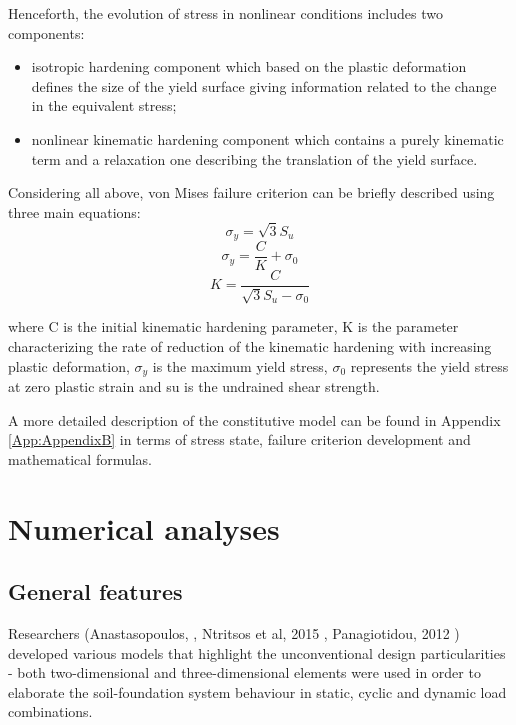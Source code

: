 \documentclass[11pt,a4paper]{report}
\begin{document}
Henceforth, the evolution of stress in nonlinear conditions includes two components:

\begin{itemize}
	\item 	isotropic hardening component which based on the plastic deformation defines the size of the yield surface giving information related to the change in the equivalent stress;
	\item 	nonlinear kinematic hardening component which contains a purely kinematic term and a relaxation one describing the translation of the yield surface.
	\end{itemize}
	
	
Considering all above, von Mises failure criterion can be briefly described using three main equations:
\begin{equation}
\sigma_y = \sqrt{3}S_u
\end{equation}
\begin{equation}
\sigma_y = \frac{C}{K}+\sigma_0
\end{equation}
\begin{equation}
K=\frac{C}{\sqrt{3}S_u-\sigma_0}
\end{equation}

where C is the initial kinematic hardening parameter, K is the parameter characterizing the rate of reduction of the kinematic hardening with increasing plastic deformation, $\sigma_y$ is the maximum yield stress, $\sigma_0$ represents the yield stress at zero plastic strain and \gls{su} is the undrained shear strength. 

A more detailed description of the constitutive model can be found in Appendix \ref{App:AppendixB} in terms of stress state, failure criterion development and mathematical formulas.

\newpage
\section{Numerical analyses}
\subsection{General features}
Researchers (Anastasopoulos, \cite{anastasopoulos2014simplified}, Ntritsos et al, 2015 \cite{ntritsos2015static}, Panagiotidou, 2012 \cite{panagiotidou2012pushover}) \mbox{developed} various models that highlight the unconventional design particularities - both two-dimensional and three-dimensional elements were used in order to elaborate the soil-foundation system behaviour in static, cyclic and dynamic load combinations. 
\end{document}
